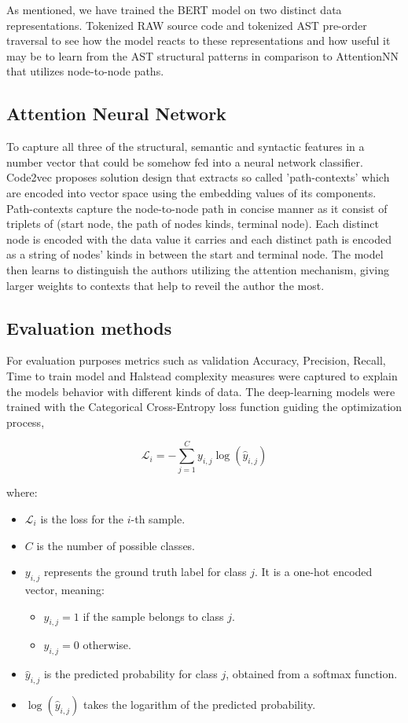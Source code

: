 \documentclass[conference]{IEEEtran}
\begin{document}
As mentioned, we have trained the BERT model on two distinct data representations. Tokenized RAW source code and tokenized AST pre-order traversal
to see how the model reacts to these representations and how useful it may be to learn from the AST structural patterns in comparison to AttentionNN 
that utilizes node-to-node paths.

\subsection{Attention Neural Network}

To capture all three of the structural, semantic and syntactic features in a number vector that could be somehow fed into a neural network classifier. 
Code2vec \cite{code2vec} proposes solution design that extracts so called 'path-contexts' which are encoded into vector space using the embedding values 
of its components.
Path-contexts capture the node-to-node path in concise manner as it consist of triplets of (start node, the path of nodes kinds, terminal node).
Each distinct node is encoded with the data value it carries and each distinct path is encoded as a string of nodes' kinds in between the start and terminal node.
The model then learns to distinguish the authors utilizing the attention mechanism, giving larger weights to contexts that help to reveil the author the most.

\subsection{Evaluation methods}
For evaluation purposes metrics such as validation Accuracy, Precision, Recall, Time to train model and Halstead complexity measures were captured to explain the models
behavior with different kinds of data. The deep-learning models were trained with the Categorical Cross-Entropy loss function guiding the optimization process,

\begin{equation}
    \mathcal{L}_i = - \sum_{j=1}^{C} y_{i,j} \log(\hat{y}_{i,j})
\end{equation}

where:
\begin{itemize}
    \item $\mathcal{L}_i$ is the loss for the $i$-th sample.
    \item $C$ is the number of possible classes.
    \item $y_{i,j}$ represents the ground truth label for class $j$. It is a one-hot encoded vector, meaning:
    \begin{itemize}
        \item $y_{i,j} = 1$ if the sample belongs to class $j$.
        \item $y_{i,j} = 0$ otherwise.
    \end{itemize}
    \item $\hat{y}_{i,j}$ is the predicted probability for class $j$, obtained from a softmax function.
    \item $\log(\hat{y}_{i,j})$ takes the logarithm of the predicted probability.
\end{itemize}
\end{document}
